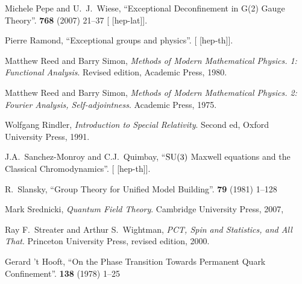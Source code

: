 \begin{thebibliography}{99}
Michele Pepe and U.~J.~Wiese,
``Exceptional Deconfinement in G(2) Gauge Theory''.
 \textbf{768} (2007) 21--37
{\tt{}}
[ [hep-lat]].

Pierre Ramond,
``Exceptional groups and physics''.
[ [hep-th]].

Matthew Reed and Barry Simon,
\textit{Methods of Modern Mathematical Physics. 1: Functional Analysis}.
Revised edition, Academic Press, 1980.

Matthew Reed and Barry Simon,
\textit{Methods of Modern Mathematical Physics. 2: Fourier Analysis, Self-adjointness}.
Academic Press, 1975.


Wolfgang Rindler,
\textit{Introduction to Special Relativity}.
Second ed, Oxford University Press, 1991.

  
J.A.~Sanchez-Monroy and C.J.~Quimbay,
``$\operatorname{SU}(3)$ Maxwell equations and the Classical Chromodynamics''.
[ [hep-th]].


R.~Slansky,
``Group Theory for Unified Model Building''.
 \textbf{79} (1981) 1--128
{\tt{}}

Mark Srednicki,
\textit{Quantum Field Theory}.
Cambridge University Press, 2007,
{\tt{}}


Ray F.~Streater and Arthur S.~Wightman,
\textit{PCT, Spin and Statistics, and All That}.
Princeton University Press, revised edition, 2000.

Gerard 't Hooft,
``On the Phase Transition Towards Permanent Quark Confinement''.
 \textbf{138} (1978) 1--25
{\tt{}}


\end{thebibliography}

